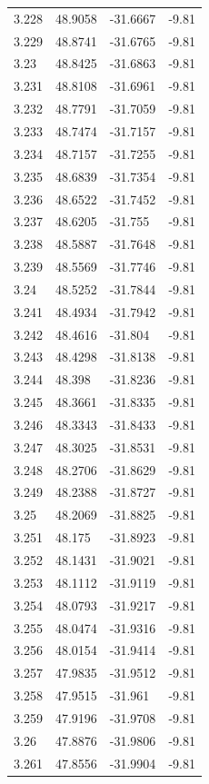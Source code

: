 \begin{tabular}{llll}
3.228 & 48.9058 & -31.6667 & -9.81 \\
3.229 & 48.8741 & -31.6765 & -9.81 \\
3.23 & 48.8425 & -31.6863 & -9.81 \\
3.231 & 48.8108 & -31.6961 & -9.81 \\
3.232 & 48.7791 & -31.7059 & -9.81 \\
3.233 & 48.7474 & -31.7157 & -9.81 \\
3.234 & 48.7157 & -31.7255 & -9.81 \\
3.235 & 48.6839 & -31.7354 & -9.81 \\
3.236 & 48.6522 & -31.7452 & -9.81 \\
3.237 & 48.6205 & -31.755 & -9.81 \\
3.238 & 48.5887 & -31.7648 & -9.81 \\
3.239 & 48.5569 & -31.7746 & -9.81 \\
3.24 & 48.5252 & -31.7844 & -9.81 \\
3.241 & 48.4934 & -31.7942 & -9.81 \\
3.242 & 48.4616 & -31.804 & -9.81 \\
3.243 & 48.4298 & -31.8138 & -9.81 \\
3.244 & 48.398 & -31.8236 & -9.81 \\
3.245 & 48.3661 & -31.8335 & -9.81 \\
3.246 & 48.3343 & -31.8433 & -9.81 \\
3.247 & 48.3025 & -31.8531 & -9.81 \\
3.248 & 48.2706 & -31.8629 & -9.81 \\
3.249 & 48.2388 & -31.8727 & -9.81 \\
3.25 & 48.2069 & -31.8825 & -9.81 \\
3.251 & 48.175 & -31.8923 & -9.81 \\
3.252 & 48.1431 & -31.9021 & -9.81 \\
3.253 & 48.1112 & -31.9119 & -9.81 \\
3.254 & 48.0793 & -31.9217 & -9.81 \\
3.255 & 48.0474 & -31.9316 & -9.81 \\
3.256 & 48.0154 & -31.9414 & -9.81 \\
3.257 & 47.9835 & -31.9512 & -9.81 \\
3.258 & 47.9515 & -31.961 & -9.81 \\
3.259 & 47.9196 & -31.9708 & -9.81 \\
3.26 & 47.8876 & -31.9806 & -9.81 \\
3.261 & 47.8556 & -31.9904 & -9.81 \\

\end{tabular}
